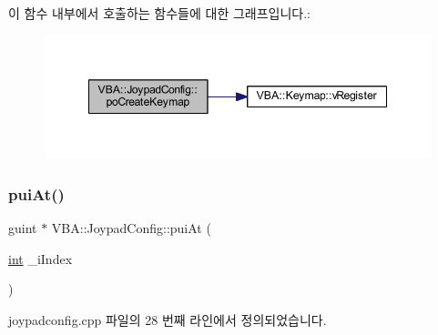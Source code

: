 이 함수 내부에서 호출하는 함수들에 대한 그래프입니다.\+:
\nopagebreak
\begin{figure}[H]
\begin{center}
\leavevmode
\includegraphics[width=348pt]{class_v_b_a_1_1_joypad_config_a959ba3641c366cf9acae6bf03990fcfb_cgraph}
\end{center}
\end{figure}
\mbox{\label{class_v_b_a_1_1_joypad_config_afa304227fa214176c874619365ffc445}} 
\subsubsection{\texorpdfstring{pui\+At()}{puiAt()}}
{\footnotesize\ttfamily guint $\ast$ V\+B\+A\+::\+Joypad\+Config\+::pui\+At (\begin{DoxyParamCaption}\item[{\mbox{\hyperlink{_util_8cpp_a0ef32aa8672df19503a49fab2d0c8071}{int}}}]{\+\_\+i\+Index }\end{DoxyParamCaption})}



joypadconfig.\+cpp 파일의 28 번째 라인에서 정의되었습니다.


